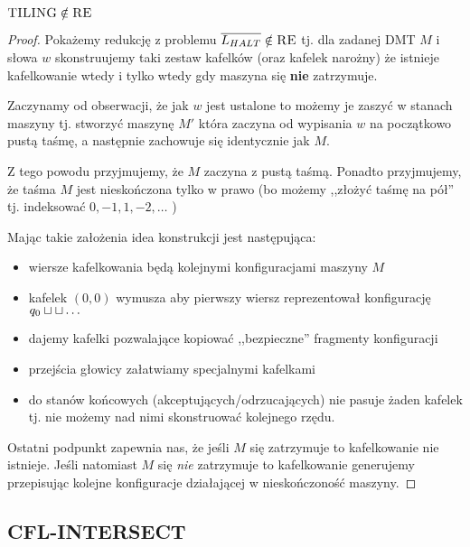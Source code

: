 \begin{theorem}
    \( \textsc{TILING} \notin \textsc{RE} \)
\end{theorem}
\begin{proof}
    Pokażemy redukcję z problemu \( \overline{L_{HALT}} \notin \textsc{RE} \) tj. dla zadanej DMT \( M \) i słowa \( w \) skonstruujemy taki zestaw kafelków (oraz kafelek narożny) że istnieje kafelkowanie wtedy i tylko wtedy gdy maszyna się \textbf{nie} zatrzymuje.
    
    Zaczynamy od obserwacji, że jak \( w \) jest ustalone to możemy je zaszyć w stanach maszyny tj. stworzyć maszynę \( M' \) która zaczyna od wypisania \( w \) na początkowo pustą taśmę, a następnie zachowuje się identycznie jak \( M \). 
    
    Z tego powodu przyjmujemy, że \( M \) zaczyna z pustą taśmą. Ponadto przyjmujemy, że taśma \( M \) jest nieskończona tylko w prawo (bo możemy ,,złożyć taśmę na pół'' tj. indeksować \( 0, -1, 1, -2, \dots \) )
    
    Mając takie założenia idea konstrukcji jest następująca:
    \begin{itemize}
        \item wiersze kafelkowania będą kolejnymi konfiguracjami maszyny \( M \)
        \item kafelek \( (0, 0) \) wymusza aby pierwszy wiersz reprezentował konfigurację \( q_0 \sqcup \sqcup \dots \)
        \item dajemy kafelki pozwalające kopiować ,,bezpieczne'' fragmenty konfiguracji
        \item przejścia głowicy załatwiamy specjalnymi kafelkami
        \item do stanów końcowych (akceptujących/odrzucających) nie pasuje żaden kafelek tj. nie możemy nad nimi skonstruować kolejnego rzędu.
    \end{itemize}
    
    Ostatni podpunkt zapewnia nas, że jeśli \( M \) się zatrzymuje to kafelkowanie nie istnieje.
    Jeśli natomiast \( M \) się \textit{nie} zatrzymuje to kafelkowanie generujemy przepisując kolejne konfiguracje działającej w nieskończoność maszyny.
    
\end{proof}

\subsection{CFL-INTERSECT}